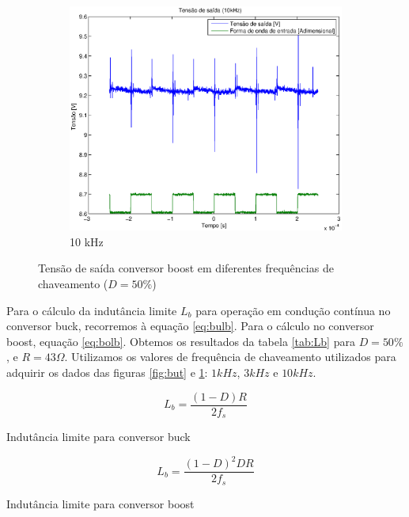 \documentclass{article}
\begin{document}
\begin{figure}[H]
\begin{subfigure}[b]{0.3\textwidth}
		\includegraphics[width=\textwidth]{Dados/boost/t10k}
		\caption{10 kHz}
	\end{subfigure}
	\caption{Tensão de saída conversor boost em diferentes frequências de chaveamento ($D=50\%$)}
	\label{fig:bot}
\end{figure}

Para o cálculo da indutância limite $L_b$ para operação em condução contínua no conversor buck, recorremos à equação \ref{eq:bulb}. Para o cálculo no conversor boost, equação \ref{eq:bolb}. Obtemos os resultados da tabela \ref{tab:Lb} para $D=50\%$, e $R=43\Omega$. Utilizamos os valores de frequência de chaveamento utilizados para adquirir os dados das figuras \ref{fig:but} e \ref{fig:bot}: $1kHz$, $3kHz$ e $10kHz$.

\begin{capequ}[H]
	\begin{equation}
	L_b = \frac{(1-D)R}{2f_s}	
	\end{equation}
	\caption{Indutância limite para conversor buck}
	\label{eq:bulb}
\end{capequ}

\begin{capequ}[H]
	\begin{equation}
	L_b = \frac{(1-D)^2DR}{2f_s}	
	\end{equation}
	\caption{Indutância limite para conversor boost}
	\label{eq:bolb}
\end{capequ}
\end{document}

